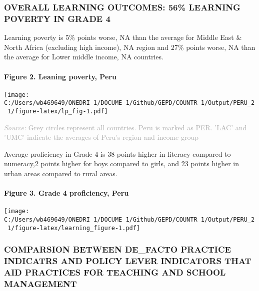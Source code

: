 \documentclass[twocolumn]{article}
\let\oldparagraph\paragraph
\renewcommand{\paragraph}[1]{\oldparagraph{#1}\mbox{}}
\begin{document}
\hypertarget{overall-learning-outcomes-56-learning-poverty-in-grade-4}{%
\subsubsection{\texorpdfstring{\textbf{OVERALL LEARNING OUTCOMES: 56\%
LEARNING POVERTY IN GRADE
4}}{OVERALL LEARNING OUTCOMES: 56\% LEARNING POVERTY IN GRADE 4}}\label{overall-learning-outcomes-56-learning-poverty-in-grade-4}}

Learning poverty is 5\% points worse, NA than the average for Middle
East \& North Africa (excluding high income), NA region and 27\% points
worse, NA than the average for Lower middle income, NA countries.

\hypertarget{figure-2.-leaning-poverty-peru}{%
\paragraph{Figure 2. Leaning poverty,
Peru}\label{figure-2.-leaning-poverty-peru}}

\texttt{[image: C:/Users/wb469649/ONEDRI~1/DOCUME~1/Github/GEPD/COUNTR~1/Output/PERU\_2~1/figure-latex/lp\_fig-1.pdf]}

{\scriptsize
    \textcolor{darkgray}{\textit{Source:} Grey circles represent all countries. Peru is marked as PER. 'LAC' and 'UMC' indicate the averages of Peru's region and income group}
  }

Average proficiency in Grade 4 is 38 points higher in literacy compared
to numeracy,2 points higher for boys compared to girls, and 23 points
higher in urban areas compared to rural areas.\\
\vfill\null

\hypertarget{figure-3.-grade-4-proficiency-peru}{%
\paragraph{Figure 3. Grade 4 proficiency,
Peru}\label{figure-3.-grade-4-proficiency-peru}}

\texttt{[image: C:/Users/wb469649/ONEDRI~1/DOCUME~1/Github/GEPD/COUNTR~1/Output/PERU\_2~1/figure-latex/learning\_figure-1.pdf]}

\hypertarget{comparsion-between-de_facto-practice-indicatrs-and-policy-lever-indicators-that-aid-practices-for-teaching-and-school-management}{%
\subsubsection{\texorpdfstring{\textbf{COMPARSION BETWEEN DE\_FACTO
PRACTICE INDICATRS AND POLICY LEVER INDICATORS THAT AID PRACTICES FOR
TEACHING AND SCHOOL
MANAGEMENT}}{COMPARSION BETWEEN DE\_FACTO PRACTICE INDICATRS AND POLICY LEVER INDICATORS THAT AID PRACTICES FOR TEACHING AND SCHOOL MANAGEMENT}}\label{comparsion-between-de_facto-practice-indicatrs-and-policy-lever-indicators-that-aid-practices-for-teaching-and-school-management}}
\end{document}
